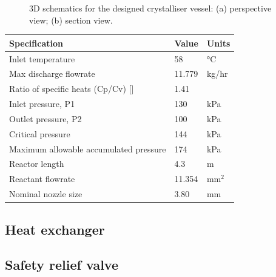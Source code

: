 \begin{figure}[H]
    \centering
    
    \caption{3D schematics for the designed crystalliser vessel: (a) perspective view; (b) section view.}
    \label{fig:schematic crystalliser process design data sheet}
\end{figure}

\begin{table}[H]
\centering
\begin{tabular}{@{}l|l|l@{}}
\toprule
\textbf{Specification}                    & \textbf{Value} & \textbf{Units} \\ \midrule
Inlet temperature                               & 58             & °C             \\ \midrule
Max discharge   flowrate                  & 11.779         & kg/hr          \\ \midrule
Ratio of   specific heats (Cp/Cv)  []       & 1.41           &                \\ \midrule
Inlet   pressure, P1                      & 130        & kPa            \\ \midrule
Outlet   pressure, P2                     & 100            & kPa            \\ \midrule
Critical   pressure                       & 144        & kPa            \\ \midrule
Maximum   allowable accumulated  pressure & 174        & kPa            \\ \midrule
Reactor length                            & 4.3          & m               \\ \midrule
Reactant flowrate                       & 11.354         & mm$^2$            \\ \midrule
Nominal nozzle   size                     & 3.80           & mm             \\ \bottomrule
\end{tabular}
\end{table}

\newpage
\subsection{Heat exchanger}

\newpage
\subsection{Safety relief valve}

